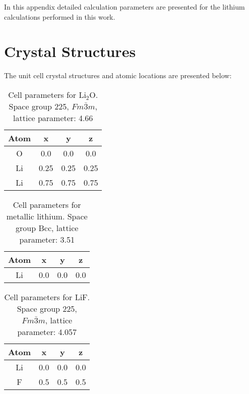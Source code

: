 In this appendix detailed calculation parameters are presented for the lithium calculations performed in this work.

\section{Crystal Structures}
The unit cell crystal structures and atomic locations are presented below:

\begin{table}[H]

	\centering
	\caption{Cell parameters for $ \mathrm{Li_2O}$.  Space group 225, $ Fm\bar{3}m $, lattice parameter: 4.66\angstrom }
	\begin{tabular}{cccc}
		Atom	& x	& y	& z				\\
		\hline
		O	& 0.0	&0.0	&0.0	\\
		Li 	& 0.25	&0.25	&0.25	\\
		Li 	& 0.75	&0.75	&0.75	\\
	\end{tabular} 
\end{table}

\begin{table}[H]
	\centering
	\caption{Cell parameters for metallic lithium.  Space group Bcc, lattice parameter: 3.51\angstrom }
	\begin{tabular}{cccc}
		Atom	& x	& y	& z				\\
		\hline
		Li	& 0.0	&0.0	&0.0	
	\end{tabular} 
\end{table}


\begin{table}
	\centering
	\caption{Cell parameters for LiF.  Space group 225, $ Fm\bar{3}m $, lattice parameter: 4.057\angstrom }
	\begin{tabular}{cccc}
		Atom	& x	& y	& z				\\
		\hline
		Li	& 0.0	&0.0	&0.0	\\
		F 	& 0.5	&0.5	&0.5	\\
	\end{tabular} 
\end{table}

